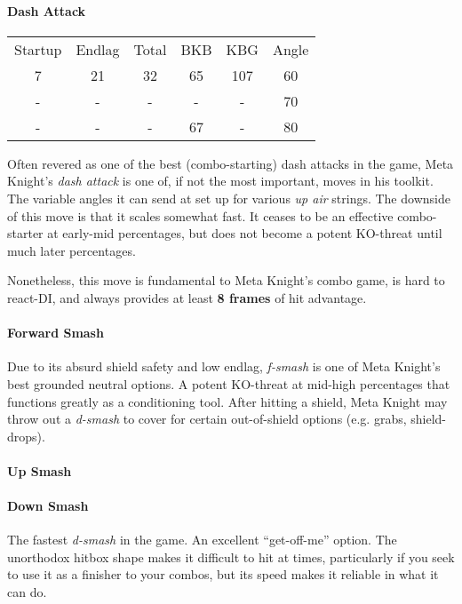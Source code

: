 \paragraph{Dash Attack}
\begin{center}
	\begin{tabular}{| c  c  c | c  c  c |}
		\hline
		Startup	& Endlag & Total & BKB & KBG & Angle \\
		7	&	21	&	32	&	65	&	107 & 	60\deg \\
		-	&	-	&	-	&	- 	& 	- 	&	70\deg	\\
		-	&	-	&	-	&	67	&	-	&	80\deg	\\
		\hline
	\end{tabular}
\end{center}
Often revered as one of the best (combo-starting) dash attacks in the game, Meta Knight's \emph{dash attack} is one of, if not the most important, moves in his toolkit. The variable angles it can send at set up for various \textit{up air} strings. The downside of this move is that it scales somewhat fast. It ceases to be an effective combo-starter at early-mid percentages, but does not become a potent KO-threat until much later percentages.

Nonetheless, this move is fundamental to Meta Knight's combo game, is hard to react-DI, and always provides at least \textbf{8 frames} of hit advantage.

\paragraph{Forward Smash}
Due to its absurd shield safety and low endlag, \textit{f-smash} is one of Meta Knight's best grounded neutral options. A potent KO-threat at mid-high percentages that functions greatly as a conditioning tool. After hitting a shield, Meta Knight may throw out a \textit{d-smash} to cover for certain out-of-shield options (e.g. grabs, shield-drops).

\paragraph{Up Smash}

\paragraph{Down Smash}
The fastest \textit{d-smash} in the game. An excellent ``get-off-me'' option. The unorthodox hitbox shape makes it difficult to hit at times, particularly if you seek to use it as a finisher to your combos, but its speed makes it reliable in what it can do.

